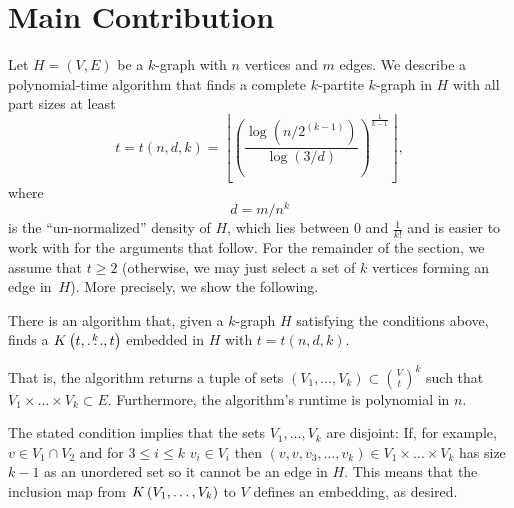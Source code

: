\section{Main Contribution}\label{sec:algorithm}
Let $H = (V, E)$ be a $k$-graph with $n$ vertices and $m$ edges.
We describe a polynomial-time algorithm that finds a complete $k$-partite $k$-graph in $H$
with all part sizes at least
\begin{equation}
     t = t (n, d, k) = \left\lfloor \left(  \frac{\log \left(n/2^{(k-1)}\right)}{\log (3/d)} \right)^{\frac{1}{k-1}} \right\rfloor \label{eq:t},
\end{equation}
where
\begin{equation} \label{eq:d}
    d = m/n^k
\end{equation}
is the ``un-normalized'' density of $H$,
which lies between $0$ and $\frac{1}{k!}$ and is easier to work with for the arguments that follow.
For the remainder of the section, we assume that
$t \geq 2$ (otherwise, we may just select a set of $k$ vertices forming an edge in~$H$).
More precisely, we show the following.
\begin{theorem}\label{thm:kpartite}
    There is an algorithm that, given a $k$-graph $H$ satisfying the conditions above,
    finds a $K\left(t, \overset{k}{\dots}, t\right)$ embedded in $H$ with $t = t(n, d, k)$.

    That is, the algorithm returns a tuple of sets ${(V_1, \dots, V_k) \subset \binom{V}{t}^k}$ such that
    $V_1 \times \dots \times V_k \subset E$.
    Furthermore, the algorithm's runtime is polynomial in $n$.
\end{theorem}

\begin{remark}
    The stated condition implies that the sets $V_1, \dots, V_k$ are disjoint:
    If, for example, $v \in V_1 \cap V_2$ and for $3 \leq i \leq k$ $v_i \in V_i$ then
    $(v, v, v_3, \dots, v_k) \in V_1 \times \dots \times V_k$ has size $k-1$ as an unordered set so it cannot
    be an edge in $H$.
    This means that the inclusion map from $K\left(V_1, \dots, V_k\right)$ to $V$ defines an embedding, as desired.
\end{remark}

